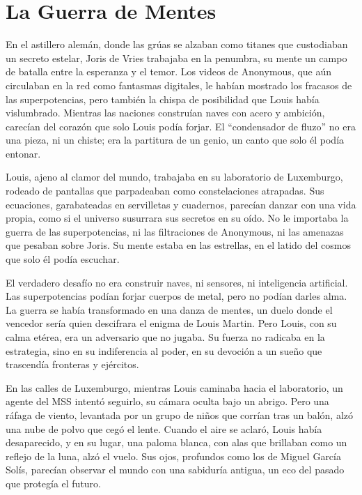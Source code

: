 \section{La Guerra de Mentes}

En el astillero alemán, donde las grúas se alzaban como titanes que custodiaban un secreto estelar, Joris de Vries trabajaba en la penumbra, su mente un campo de batalla entre la esperanza y el temor. Los videos de Anonymous, que aún circulaban en la red como fantasmas digitales, le habían mostrado los fracasos de las superpotencias, pero también la chispa de posibilidad que Louis había vislumbrado. Mientras las naciones construían naves con acero y ambición, carecían del corazón que solo Louis podía forjar. El “condensador de fluzo” no era una pieza, ni un chiste; era la partitura de un genio, un canto que solo él podía entonar.

Louis, ajeno al clamor del mundo, trabajaba en su laboratorio de Luxemburgo, rodeado de pantallas que parpadeaban como constelaciones atrapadas. Sus ecuaciones, garabateadas en servilletas y cuadernos, parecían danzar con una vida propia, como si el universo susurrara sus secretos en su oído. No le importaba la guerra de las superpotencias, ni las filtraciones de Anonymous, ni las amenazas que pesaban sobre Joris. Su mente estaba en las estrellas, en el latido del cosmos que solo él podía escuchar.

El verdadero desafío no era construir naves, ni sensores, ni inteligencia artificial. Las superpotencias podían forjar cuerpos de metal, pero no podían darles alma. La guerra se había transformado en una danza de mentes, un duelo donde el vencedor sería quien descifrara el enigma de Louis Martin. Pero Louis, con su calma etérea, era un adversario que no jugaba. Su fuerza no radicaba en la estrategia, sino en su indiferencia al poder, en su devoción a un sueño que trascendía fronteras y ejércitos.

En las calles de Luxemburgo, mientras Louis caminaba hacia el laboratorio, un agente del MSS intentó seguirlo, su cámara oculta bajo un abrigo. Pero una ráfaga de viento, levantada por un grupo de niños que corrían tras un balón, alzó una nube de polvo que cegó el lente. Cuando el aire se aclaró, Louis había desaparecido, y en su lugar, una paloma blanca, con alas que brillaban como un reflejo de la luna, alzó el vuelo. Sus ojos, profundos como los de Miguel García Solís, parecían observar el mundo con una sabiduría antigua, un eco del pasado que protegía el futuro.
